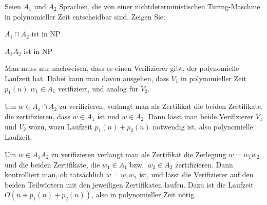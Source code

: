 Seien $A_1$ und $A_2$ Sprachen, die von einer nichtdeterministischen
Turing-Maschine in polynomieller Zeit entscheidbar sind. Zeigen Sie:
\begin{teilaufgaben}
\item $A_1\cap A_2$ ist in NP
\item $A_1A_2$ ist in NP
\end{teilaufgaben}

\begin{loesung}
Man muss nur nachweisen, dass es einen Verifizierer gibt, der polynomielle
Laufzeit hat. Dabei kann man davon ausgehen, dass $V_1$ in polynomieller
Zeit $p_1(n)$ $w_1\in A_1$ verifiziert, und analog für $V_2$.
\begin{teilaufgaben}
\item
Um $w\in A_1\cap A_2$ zu verifizieren, verlangt man als Zertifikat
die beiden Zertifikate, die zertifizieren, dass $w\in  A_1$
ist und $w\in A_2$. Dann lässt man beide Verifizierer
$V_1$ und $V_2$ wozu, wozu Laufzeit $p_1(n)+p_2(n)$ notwendig ist,
also polynomielle Laufzeit.
\item
Um $w\in A_1A_2$ zu verifizieren verlangt man als Zertifikat
die Zerlegung $w=w_1w_2$ und die beiden Zertifikate, die 
$w_1\in A_1$ bzw.~$w_2\in A_2$ zertifizieren. Dann kontrolliert
man, ob tatsächlich $w=w_1w_2$ ist, und  lässt
die Verifizierer auf den beiden Teilwörtern mit den
jeweiligen Zertifikaten laufen.
Dazu ist die Laufzeit
$O(n + p_1(n) + p_2(n))$, also in polynomieller Zeit nötig.
\qedhere
\end{teilaufgaben}
\end{loesung}
